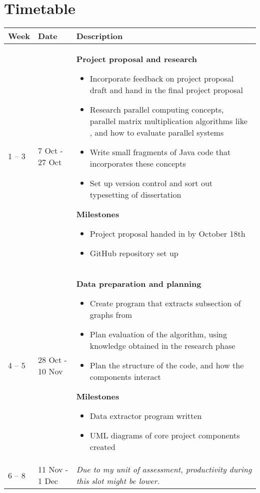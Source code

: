 \documentclass[../dissertation/diss.tex]{subfiles}
\begin{document}
\newpage

\section*{Timetable}%
\label{sec:Timetable}

\begin{longtable}{m{40pt}m{75pt}m{265pt}}
    \hline
    \hline
    \textbf{Week} & \textbf{Date} & \textbf{Description} \\
    \hline
    1 -- 3 & 7 Oct - 27 Oct & %
    \textbf{Project proposal and research}
    \begin{itemize}
        \item Incorporate feedback on project proposal draft and hand in the
            final project proposal
        \item Research parallel computing concepts, parallel matrix
            multiplication algorithms like \cite{fox, cannon}, and how to evaluate
            parallel systems
        \item Write small fragments of Java code that incorporates these concepts
        \item Set up version control and sort out typesetting of dissertation
    \end{itemize}
    \textbf{Milestones}
    \begin{itemize}
        \item Project proposal handed in by October 18th
        \item GitHub repository set up
    \end{itemize} \\
    \hline
    4 -- 5 & 28 Oct - 10 Nov & %
    \textbf{Data preparation and planning}
    \begin{itemize}
        \item Create program that extracts subsection of graphs from \cite{road-data}
        \item Plan evaluation of the algorithm, using knowledge obtained in the research
            phase
        \item Plan the structure of the code, and how the components interact
    \end{itemize}
    \textbf{Milestones}
    \begin{itemize}
        \item Data extractor program written
        \item UML diagrams of core project components created
    \end{itemize} \\
    \hline
    6 -- 8 & 11 Nov - 1 Dec & %
    \textit{Due to my unit of assessment, productivity during this slot might be lower.}


\end{longtable}
\end{document}
